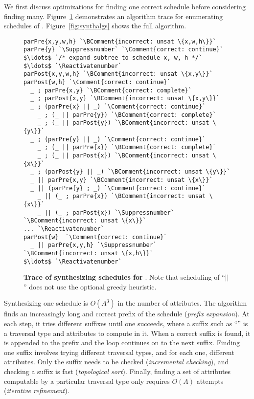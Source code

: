 We first discuss optimizations for  finding one correct schedule before considering finding many. Figure~\ref{fig:searchtrace} demonstrates an algorithm trace for enumerating schedules of \mbox{\hlang{}.} Figure~\ref{fig:synthalgs} shows the full algorithm.

\begin{figure}
\centering
\begin{minipage}{0.8\columnwidth}
\begin{lstlisting}[mathescape,escapechar=\`,morekeywords={parPre,parPost,;,||}]
parPre{x,y,w,h} `\BComment{incorrect: unsat \{x,w,h\}}`
parPre{y} `\Suppressnumber` `\Comment{correct: continue}`
$\ldots$ `/* expand subtree to schedule x, w, h */` $\ldots$ `\Reactivatenumber`
parPost{x,y,w,h} `\BComment{incorrect: unsat \{x,y\}}`
parPost{w,h} `\Comment{correct: continue}`
  _ ; parPre{x,y} `\BComment{correct: complete}`
  _ ; parPost{x,y} `\BComment{incorrect: unsat \{x,y\}}`
  _ ; (parPre{x} || _) `\Comment{correct: continue}`
    _ ; (_ || parPre{y}) `\BComment{correct: complete}`
    _ ; (_ || parPost{y}) `\BComment{incorrect: unsat \{y\}}`
  _ ; (parPre{y} || _) `\Comment{correct: continue}`
    _ ; (_ || parPre{x}) `\BComment{correct: complete}`
    _ ; (_ || parPost{x}) `\BComment{incorrect: unsat \{x\}}`
  _ ; (parPost{y} || _) `\BComment{incorrect: unsat \{y\}}`
  _ || parPre{x,y} `\BComment{incorrect: unsat \{x\}}`
  _ || (parPre{y} ; _) `\Comment{correct: continue}`
    _ || (_ ; parPre{x}) `\BComment{incorrect: unsat \{x\}}`
    _ || (_ ; parPost{x}) `\Suppressnumber` `\BComment{incorrect: unsat \{x\}}`
... `\Reactivatenumber`
parPost{w}  `\Comment{correct: continue}` 
  _ || parPre{x,y,h} `\Suppressnumber` `\BComment{incorrect: unsat \{x,h\}}`
$\ldots$ `\Reactivatenumber`
\end{lstlisting}
\end{minipage}
\caption{\textbf{Trace of synthesizing schedules for \hlang{}}. Note that scheduling of ``$||$'' does not use the optional greedy heuristic.}
\label{fig:searchtrace}
\end{figure}

Synthesizing one schedule is $O(A^3)$ in the number of attributes. The algorithm finds an increasingly long and correct prefix of the schedule (\emph{prefix expansion}). At each step, it tries different suffixes until one succeeds, where a suffix such as ``'' is a traversal type and attributes to compute in it. When a correct suffix is found, it is appended to the prefix and the loop continues on to the next suffix. Finding one suffix involves trying different traversal types, and for each one, different attributes. Only the suffix needs to be checked (\emph{incremental checking}), and checking a suffix is fast (\emph{topological sort}). Finally, finding a set of attributes computable by a particular traversal type only requires $O(A)$ attempts (\emph{iterative refinement}).

